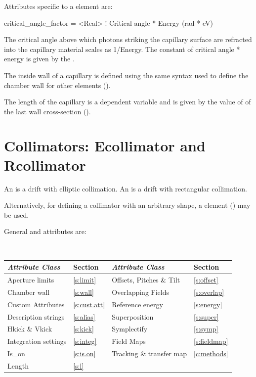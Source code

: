 Attributes specific to a  element are:
\begin{example}
  critical_angle_factor = <Real>    ! Critical angle * Energy (rad * eV)
\end{example}

The critical angle above which photons striking the capillary surface are
refracted into the capillary material scales as 1/Energy. The
constant of critical angle * energy is given by the .

The inside wall of a capillary is defined using the same syntax used
to define the chamber wall for other elements ().

The length of the capillary is a dependent variable and is given by
the value of  of the last wall cross-section
().

\newpage

\section{Collimators: Ecollimator and Rcollimator} 
\label{s:col}

An  is a drift with elliptic collimation. An  is a drift
with rectangular collimation.

Alternatively, for defining a collimator with an arbitrary shape, a  element
() may be used.

General  and  attributes are:
\begin{center}
\tt
\begin{tabular}{llll} \toprule
  {\sl Attribute Class}      & Section          & {\sl Attribute Class}      & Section          \\ \midrule
  Aperture limits            & \ref{s:limit}    & Offsets, Pitches \& Tilt   & \ref{s:offset}   \\
  Chamber wall               & \ref{s:wall}     & Overlapping Fields         & \ref{s:overlap}  \\
  Custom Attributes          & \ref{s:cust.att} & Reference energy           & \ref{s:energy}   \\
  Description strings        & \ref{s:alias}    & Superposition              & \ref{s:super}    \\
  Hkick \& Vkick             & \ref{s:kick}     & Symplectify                & \ref{s:symp}     \\
  Integration settings       & \ref{s:integ}    & Field Maps                 & \ref{s:fieldmap} \\
  Is_on                      & \ref{s:is.on}    & Tracking \& transfer map   & \ref{c:methods}  \\
  Length                     & \ref{s:l}        &                            &                  \\
  \bottomrule
\end{tabular}
\end{center}
\toffset


